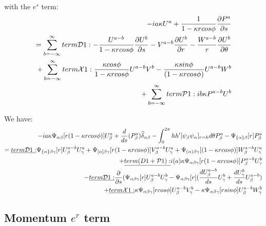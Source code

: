 \documentclass{Note}
\begin{document}
 with the $e^s$ term:
\begin{equation}
\begin{aligned}
-ia\kappa U^a+{1\over {1-\kappa rcos\phi}}{\partial P^a\over {\partial s}}\\
=\sum_{b=-\infty}^{\infty}
term\mathcal{D}1: -{U^{a-b}\over {1-\kappa r cos\phi}}  {{\partial U^b} \over {\partial s}}-V^{a-b}{{\partial U^b}\over{\partial r}}-{W^{a-b}\over r}{{\partial U^b}\over {\partial \theta}}\\
+ \sum_{b=-\infty}^{\infty}
term\mathcal{X}1: {\kappa cos\phi \over{1-\kappa rcos\phi}}U^{a-b}V^b-{\kappa sin\phi \over{(1-\kappa r cos\phi)}}U^{a-b}W^b\\
+\sum_{b=-\infty}^{\infty}
term\mathcal{P}1:ib\kappa P^{a-b}U^{b}
\end{aligned}
\end{equation}

We have:
\begin{equation}
\begin{aligned}
-ia\kappa \Psi_{\alpha\beta}[r(1-\kappa rcos\phi)]U_\beta^a
+{d \over {d s}} (P_\beta^a )\widehat{\delta }_{\alpha\beta}
-\int_0^{2\pi} hh'[ \psi_\beta \psi_\alpha ]_{r=h} d\theta P_\beta^a-\Psi_{\{\alpha\}\beta}[r] P_\beta^a\\
=
\underline{term \mathcal{D}1:}  \Psi_{\{\alpha\}\beta\gamma} [r]U_\beta^{a-b}U_\gamma^a
+\Psi_{[\alpha]\beta\gamma} [r(1-\kappa rcos\phi)]V_\beta^{a-b}U_\gamma^a
+ \Psi_{(\alpha)\beta\gamma} [(1-\kappa rcos\phi)]W_\beta^{a-b}U_\gamma^a\\
+\underline{term\mathcal({D}1+\mathcal{P}1):}  i(a)\kappa \Psi_{\alpha\beta\gamma}[r(1-\kappa r cos\phi)]P_\beta^{a-b}U_\gamma^{b}\\
-\underline{term \mathcal{D}1:} {{\partial }\over {\partial s}}(\Psi_{\alpha\beta\gamma}[r]U_\beta^{a-b}U_\gamma^{b}
-\Psi_{\alpha\beta\gamma}[r]({{d U_\beta^{a-b} \over {d s}}U_\gamma^{b}}+{dU_\gamma^{b}\over ds}U_\beta^{a-b})\\
+\underline{term \mathcal{X}1:} \kappa \Psi_{\alpha\beta\gamma}[rcos\phi]U_\beta^{a-b}V_\gamma^b-\kappa \Psi_{\alpha\beta\gamma}[r sin\phi]U_\beta^{a-b}W_\gamma^b\\
\end{aligned}
\end{equation}




\subsection{Momentum $e^r$ term}
\end{document}
